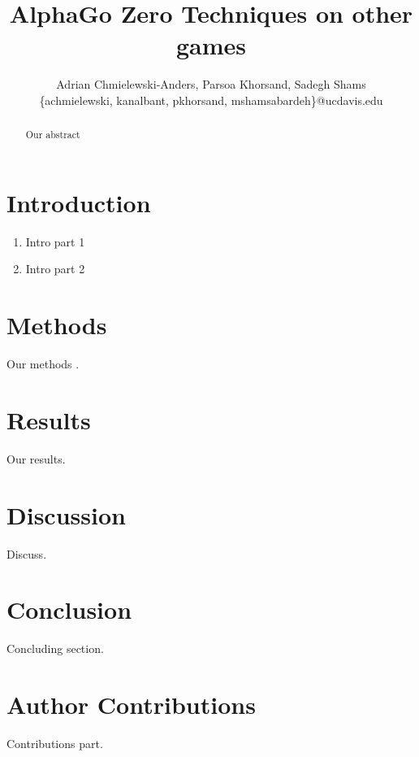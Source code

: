 \documentclass[conference]{IEEEtran}
\begin{document}
\title{AlphaGo Zero Techniques on other games}

\author{
Adrian Chmielewski-Anders, Parsoa Khorsand, Sadegh Shams \\
\{achmielewski, kanalbant, pkhorsand, mshamsabardeh\}@ucdavis.edu
}

\maketitle

\begin{abstract}
    Our abstract
\end{abstract}


%



\section{Introduction}
\begin{enumerate}
    \item
    Intro part 1
    \item
    Intro part 2

\end{enumerate}

\section{Methods}
    Our methods \cite{AlphaGoZero}.
\section{Results}
    Our results.

\section{Discussion}
    Discuss.

\section{Conclusion}
    Concluding section.





\section{Author Contributions}
    Contributions part.
\end{document}
